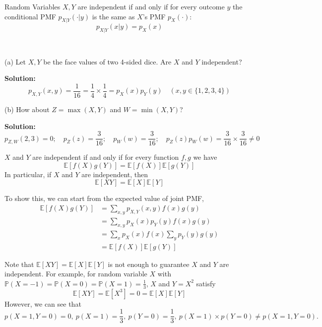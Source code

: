 Random Variables \(X, Y\) are independent if and only if for every outcome \(y\)  the conditional PMF \(p_{X \vert Y} (\cdot \vert y)\) is the same as \(X\)’s PMF \(p_X (\cdot)\): 
\[
    p_{X \vert Y} (x \vert y) = p_X(x)
\]

\begin{eg}~ 

    (a) Let \(X, Y\) be the face values of two 4-sided dice. Are \(X\) and \(Y\) independent?

    \textbf{Solution:} 
    \[
        p_{X, Y}(x, y) = \dfrac{1}{16} =\dfrac{1}{4} \times \dfrac{1}{4} = p_X(x)p_Y(y) \quad (x, y \in \{1, 2, 3, 4\})
    \]

    (b) How about \(Z = \max(X, Y)\) and \(W = \min(X, Y)\)?

    \textbf{Solution:} 
    \[
        p_{Z, W}(2, 3) = 0;\quad p_Z(z) = \dfrac{3}{16};\quad p_W(w) =\dfrac{3}{16};\quad p_Z(z)p_W(w) = \dfrac{3}{16} \times \dfrac{3}{16} \neq 0
    \]
\end{eg}

\begin{theorem}
    \(X\) and \(Y\) are independent if and only if for every function \(f, g\) we have 
    \[
        \mathbb{E}[f(X)g(Y)] = \mathbb{E}[f(X)]\mathbb{E}[g(Y)]
    \]
    In particular, if \(X\) and \(Y\) are independent, then
    \[
        \mathbb{E}[XY] = \mathbb{E}[X]\mathbb{E}[Y]
    \]
\end{theorem}

To show this, we can start from the expected value of joint PMF, 
\[
    \begin{aligned}
        \mathbb{E}[f(X)g(Y)] &= \sum_{x, y} p_{X,Y}(x, y)f(x)g(y) \\
        &= \sum_{x, y} p_{X}(x)p_{Y}(y)f(x)g(y) \\
        &= \sum_{x} p_{X}(x)f(x) \sum_{y} p_{Y}(y)g(y) \\
        &= \mathbb{E}[f(X)]\mathbb{E}[g(Y)]
    \end{aligned}
\]

Note that \(\mathbb{E}[XY] = \mathbb{E}[X]\mathbb{E}[Y]\) is not enough to guarantee \(X\) and \(Y\) are independent. For example, for random variable \(X\) with \(\mathbb{P}(X = -1) = \mathbb{P}(X = 0) = \mathbb{P}(X = 1) = \frac{1}{3}\), \(X\) and \(Y = X^2\) satisfy 
\[
    \mathbb{E}[XY] = \mathbb{E}[X^3] = 0 = \mathbb{E}[X]\mathbb{E}[Y]
\]
However, we can see that 
\[
    p(X = 1, Y = 0) = 0,\ p(X = 1) = \frac{1}{3},\ p(Y = 0) = \frac{1}{3},\ p(X = 1) \times p(Y = 0) \neq p(X = 1, Y = 0).
\] 

